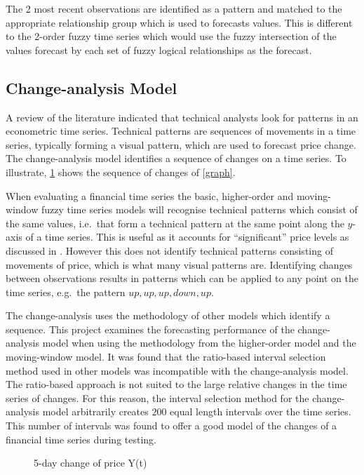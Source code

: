 \documentclass[12pt, oneside, a4paper]{article}
\theoremstyle{definition}
\begin{document}
The 2 most recent observations are identified as a pattern and matched to the appropriate relationship group which is used to forecasts values. This is different to the 2-order fuzzy time series which would use the fuzzy intersection of the values forecast by each set of fuzzy logical relationships as the forecast.

\subsection{Change-analysis Model}

A review of the literature indicated that technical analysts look for patterns in an econometric time series. Technical patterns are sequences of movements in a time series, typically forming a visual pattern, which are used to forecast price change. The change-analysis model identifies a sequence of changes on a time series. To illustrate, \cref{changes} shows the sequence of changes of \cref{graph}. 

When evaluating a financial time series the basic, higher-order and moving-window fuzzy time series models will recognise technical patterns which consist of the same values, i.e.\ that form a technical pattern at the same point along the $y$-axis of a time series. This is useful as it accounts for ``significant'' price levels as discussed in . However this does not identify technical patterns consisting of movements of price, which is what many visual patterns are. Identifying changes between observations results in patterns which can be applied to any point on the time series, e.g.\ the pattern $up,up,up,down,up$.

The change-analysis uses the methodology of other models which identify a sequence. This project examines the forecasting performance of the change-analysis model when using the methodology from the higher-order model and the moving-window model. It was found that the ratio-based interval selection method used in other models was incompatible with the change-analysis model. The ratio-based approach is not suited to the large relative changes in the time series of changes. For this reason, the interval selection method for the change-analysis model arbitrarily creates $200$ equal length intervals over the time series. This number of intervals was found to offer a good model of the changes of a financial time series during testing.

\begin{figure}[H]
	\centering
	\caption{5-day change of price Y(t)}
	\label{changes}
\end{figure}
\end{document}
